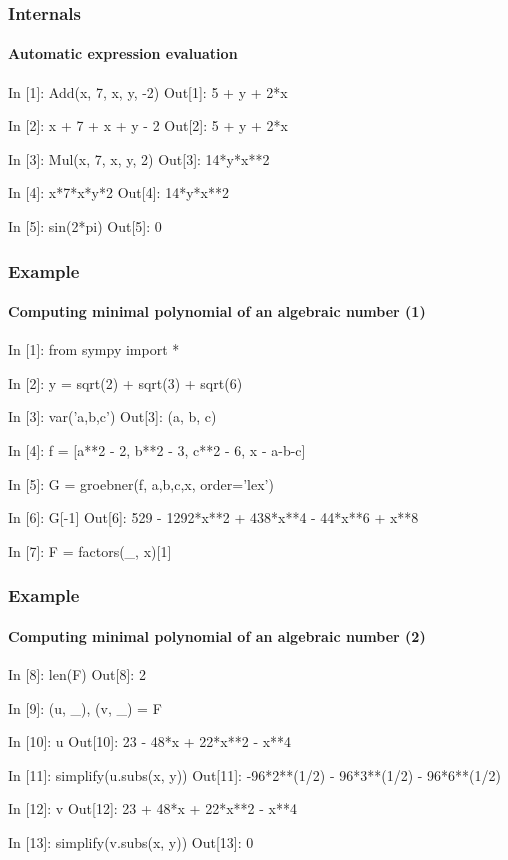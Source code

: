 \documentclass{beamer}
\begin{document}
\begin{frame}[fragile]
    \frametitle{Internals}
    \framesubtitle{Automatic expression evaluation}

    \begin{python}
In [1]: Add(x, 7, x, y, -2)
Out[1]: 5 + y + 2*x

In [2]: x + 7 + x + y - 2
Out[2]: 5 + y + 2*x

In [3]: Mul(x, 7, x, y, 2)
Out[3]: 14*y*x**2

In [4]: x*7*x*y*2
Out[4]: 14*y*x**2

In [5]: sin(2*pi)
Out[5]: 0
    \end{python}

\end{frame}

\begin{frame}[fragile]
    \frametitle{Example}
    \framesubtitle{Computing minimal polynomial of an algebraic number (1)}

    \begin{python}
In [1]: from sympy import *

In [2]: y = sqrt(2) + sqrt(3) + sqrt(6)

In [3]: var('a,b,c')
Out[3]: (a, b, c)

In [4]: f = [a**2 - 2, b**2 - 3, c**2 - 6, x - a-b-c]

In [5]: G = groebner(f, a,b,c,x, order='lex')

In [6]: G[-1]
Out[6]: 529 - 1292*x**2 + 438*x**4 - 44*x**6 + x**8

In [7]: F = factors(_, x)[1]
    \end{python}
\end{frame}

\begin{frame}[fragile]
    \frametitle{Example}
    \framesubtitle{Computing minimal polynomial of an algebraic number (2)}

    \begin{python}
In [8]: len(F)
Out[8]: 2

In [9]: (u, _), (v, _) = F

In [10]: u
Out[10]: 23 - 48*x + 22*x**2 - x**4

In [11]: simplify(u.subs(x, y))
Out[11]: -96*2**(1/2) - 96*3**(1/2) - 96*6**(1/2)

In [12]: v
Out[12]: 23 + 48*x + 22*x**2 - x**4

In [13]: simplify(v.subs(x, y))
Out[13]: 0
    \end{python}
\end{frame}
\end{document}

